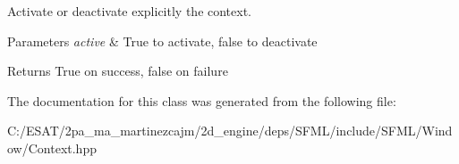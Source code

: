 Activate or deactivate explicitly the context. 


\begin{DoxyParams}{Parameters}
{\em active} & True to activate, false to deactivate\\
\hline
\end{DoxyParams}
\begin{DoxyReturn}{Returns}
True on success, false on failure 
\end{DoxyReturn}


The documentation for this class was generated from the following file\+:\begin{DoxyCompactItemize}
\item 
C\+:/\+E\+S\+A\+T/2pa\+\_\+ma\+\_\+martinezcajm/2d\+\_\+engine/deps/\+S\+F\+M\+L/include/\+S\+F\+M\+L/\+Window/Context.\+hpp\end{DoxyCompactItemize}
